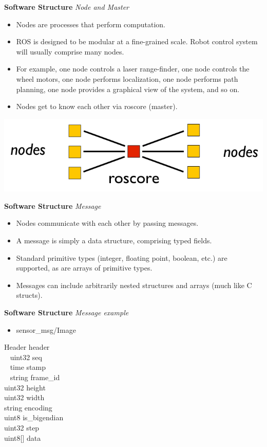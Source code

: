 \documentclass[a4paper, 10pt, conference]{ieeeconf}       %
\begin{document}
\textbf{Software Structure}
\textit{Node and Master}

\begin{itemize}
  \item Nodes are processes that perform computation. 
  \item ROS is designed to be modular at a fine-grained scale. Robot control system will usually comprise many nodes.
  \item For example, one node controls a laser range-finder, one node controls the wheel motors, one node performs localization, one node performs path planning, one node provides a graphical view of the system, and so on.
  \item Nodes get to know each other via roscore (master).
\end{itemize}

\begin{center}
  \includegraphics[width=.6\textwidth]{nodes}
\end{center}




\textbf{Software Structure}
\textit{Message}

\begin{itemize}
  \item Nodes communicate with each other by passing messages.
  \item A message is simply a data structure, comprising typed fields. 
  \item Standard primitive types (integer, floating point, boolean, etc.) are supported, as are arrays of primitive types. 
  \item Messages can include arbitrarily nested structures and arrays (much like C structs).
\end{itemize}



\textbf{Software Structure}
\textit{Message example}

\begin{itemize}
  \item sensor\_msg/Image
\end{itemize}

Header header \\
~  uint32 seq \\
~  time stamp \\
~  string frame\_id \\
uint32 height \\
uint32 width \\
string encoding \\
uint8 is\_bigendian \\
uint32 step \\
uint8[] data
\end{document}
